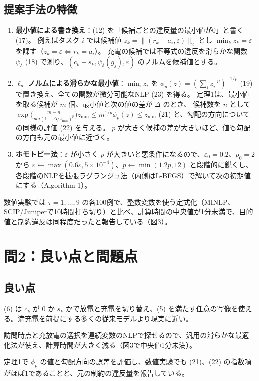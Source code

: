 \documentclass[uplatex,dvipdfmx,a4paper,11pt,jafont=haranoaji]{bxjsarticle}
\newcommand{\answerpart}[1]{\par\Needspace{6\baselineskip}\subsection*{#1}}
\newcommand{\norm}[1]{\lVert #1\rVert_2}
\begin{document}
\answerpart{提案手法の特徴}
\begin{enumerate}
  \item \textbf{最小値による書き換え}：(12) を「候補ごとの違反量の最小値が0」と書く (17)。
  例えばタスク $i$ では候補値 $z_k=\norm{(r_k-a_i,\varepsilon)}$ とし $\min_kz_k=\varepsilon$ を課す（$z_k=\varepsilon\iff r_k=a_i$）。
  充電の候補では不等式の違反を滑らかな関数 $\psi_\delta$ (18) で測り、$(c_k-s_k,\psi_\delta(g_j),\varepsilon)$ のノルムを候補値とする。
  \item \textbf{$\ell_p$ ノルムによる滑らかな最小値}：$\min_iz_i$ を $\phi_p(z)=(\sum_iz_i^{-p})^{-1/p}$ (19) で置き換え、全ての関数が微分可能なNLP (23) を得る。
  定理1は、最小値を取る候補が $m$ 個、最小値と次の値の差が $\Delta$ のとき、
  候補数を $n$ として $\exp\!\bigl(\frac{m-n}{pm(1+\Delta/z_{\min})^p}\bigr)z_{\min}\le m^{1/p}\phi_p(z)\le z_{\min}$ (21) と、勾配の方向についての同様の評価 (22) を与える。
  $p$ が大きく候補の差が大きいほど、値も勾配の方向も元の最小値に近づく。
  \item \textbf{ホモトピー法}：$\varepsilon$ が小さく $p$ が大きいと悪条件になるので、$\varepsilon_0=0.2$、$p_0=2$ から $\varepsilon\leftarrow\max(0.6\varepsilon,5\times10^{-4})$、$p\leftarrow\min(1.2p,12)$ と段階的に鋭くし、各段階のNLPを拡張ラグランジュ法（内側はL-BFGS）で解いて次の初期値にする（Algorithm 1）。
\end{enumerate}
数値実験では $\tau=1,\dots,9$ の各100例で、整数変数を使う定式化（MINLP、SCIP/Juniperで10時間打ち切り）と比べ、計算時間の中央値が1分未満で、目的値と制約違反は同程度だったと報告している（図3）。

\FloatBarrier
\section{問2：良い点と問題点}

\answerpart{良い点}
\begin{description}[leftmargin=1em]
  \item[部分充電と非線形充電を一つの式で扱う] (6) は $c_k$ が $0$ か $s_k$ かで放電と充電を切り替え、(5) を満たす任意の写像を使える。満充電を前提にする多くの従来モデルより現実に近い。
  \item[整数変数を使わない] 訪問時点と充放電の選択を連続変数のNLPで探せるので、汎用の滑らかな最適化法が使え、計算時間が大きく減る（図3で中央値1分未満）。
  \item[近似の質を定量化している] 定理1で $\phi_p$ の値と勾配方向の誤差を評価し、数値実験でも (21)、(22) の指数項がほぼ1であることと、元の制約の違反量を報告している。
\end{description}
\end{document}
